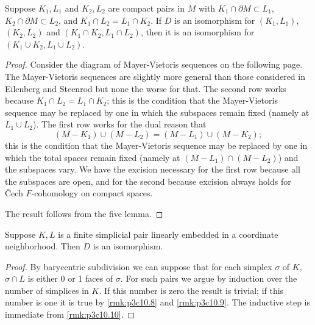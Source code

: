 \documentclass[../main]{subfiles}
\begin{document}
\begin{remark}\label{rmk:p3c10.10}
Suppose $K_1,L_1$ and $K_2,L_2$ are compact pairs in $M$ with $K_1 \cap \partial M \subset L_1$, $K_2 \cap \partial M \subset L_2$, and $K_1 \cap L_2 = L_1 \cap K_2$. If $D$ is an isomorphism for $(K_1,L_1)$, $(K_2,L_2)$ and $(K_1\cap K_2,L_1 \cap L_2)$, then it is an isomorphism for $(K_1 \cup K_2, L_1 \cup L_2)$.
\end{remark}
\begin{proof}
Consider the diagram of Mayer-Vietoris sequences on the following page. The Mayer-Vietoris sequences are slightly more general than those considered in Eilenberg and Steenrod but none the worse for that. The second row works because $K_1 \cap L_2 = L_1 \cap K_2$; this is the condition that the Mayer-Vietoris sequence may be replaced by one in which the subspaces remain fixed (namely at $L_1 \cup L_2$). The first row works for the dual reason that
\[(M-K_1) \cup (M-L_2) = (M-L_1) \cup (M-K_2);\]
this is the condition that the Mayer-Vietoris sequence may be replaced by one in which the total spaces remain fixed (namely at $(M-L_1) \cap (M-L_2)$) and the subspaces vary. We have the excision necessary for the first row because all the subspaces are open, and for the second because excision always holds for \v{C}ech $F$-cohomology on compact spaces.

The result follows from the five lemma.
\end{proof}
\begin{remark}\label{rmk:p3c10.11}
Suppose $K,L$ is a finite simplicial pair linearly embedded in a coordinate neighborhood. Then $D$ is an isomorphism.
\end{remark}
\begin{proof}
By barycentric subdivision we can suppose that for each simplex $\sigma$ of $K$, $\sigma \cap L$ is either 0 or 1 faces of $\sigma$. For such pairs we argue by induction over the number of simplices in $K$. If this number is zero the result is trivial; if this number is one it is true by \ref{rmk:p3c10.8} and \ref{rmk:p3c10.9}. The inductive step is immediate from \ref{rmk:p3c10.10}.
\end{proof}
\end{document}
